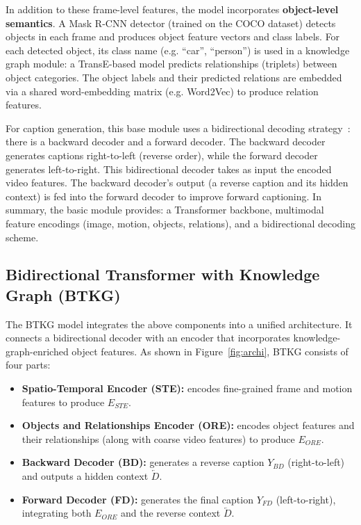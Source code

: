 In addition to these frame-level features, the model incorporates \textbf{object-level semantics}. A Mask R-CNN detector (trained on the COCO dataset) detects objects in each frame and produces object feature vectors and class labels. For each detected object, its class name (e.g. ``car'', ``person'') is used in a knowledge graph module: a TransE-based model predicts relationships (triplets) between object categories. The object labels and their predicted relations are embedded via a shared word-embedding matrix (e.g. Word2Vec) to produce relation features.

For caption generation, this base module uses a bidirectional decoding strategy~\cite{BiTransformer}: there is a backward decoder and a forward decoder. The backward decoder generates captions right-to-left (reverse order), while the forward decoder generates left-to-right. This bidirectional decoder takes as input the encoded video features. The backward decoder's output (a reverse caption and its hidden context) is fed into the forward decoder to improve forward captioning. In summary, the basic module provides: a Transformer backbone, multimodal feature encodings (image, motion, objects, relations), and a bidirectional decoding scheme.

\subsection{Bidirectional Transformer with Knowledge Graph (BTKG)}

The BTKG model integrates the above components into a unified architecture. It connects a bidirectional decoder with an encoder that incorporates knowledge-graph-enriched object features. As shown in Figure~\ref{fig:archi}, BTKG consists of four parts:

\begin{itemize}[nosep]
    \item \textbf{Spatio-Temporal Encoder (STE):} encodes fine-grained frame and motion features to produce $E_{STE}$.
    
    \item \textbf{Objects and Relationships Encoder (ORE):} encodes object features and their relationships (along with coarse video features) to produce $E_{ORE}$.
    
    \item \textbf{Backward Decoder (BD):} generates a reverse caption $Y_{BD}$ (right-to-left) and outputs a hidden context $\overleftarrow{D}$.
    
    \item \textbf{Forward Decoder (FD):} generates the final caption $Y_{FD}$ (left-to-right), integrating both $E_{ORE}$ and the reverse context $\overleftarrow{D}$.
\end{itemize}

